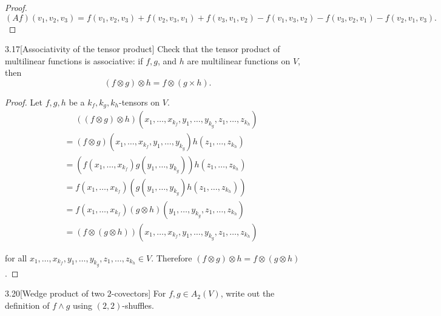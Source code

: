 \begin{proof}
    \( (Af)(v_{1}, v_{2}, v_{3}) = f(v_{1}, v_{2}, v_{3}) + f(v_{2}, v_{3}, v_{1}) + f(v_{3}, v_{1}, v_{2}) - f(v_{1}, v_{3}, v_{2}) - f(v_{3}, v_{2}, v_{1}) - f(v_{2}, v_{1}, v_{3}). \)
\end{proof}

\begin{exercise}{3.17}[Associativity of the tensor product]
    Check that the tensor product of multilinear functions is associative: if \( f, g \), and \( h \) are multilinear functions on \( V \), then
    \[
        (f \otimes g)\otimes h = f\otimes (g\times h).
    \]
\end{exercise}

\begin{proof}
    Let \( f, g, h \) be a \( k_{f}, k_{g}, k_{h} \)-tensors on \( V \).
    \begingroup
    \allowdisplaybreaks%
    \begin{align*}
         & \phantom{=} ((f \otimes g) \otimes h)(x_{1}, \ldots, x_{k_{f}}, y_{1}, \ldots, y_{k_{g}}, z_{1}, \ldots, z_{k_{h}}) \\
         & = (f \otimes g)(x_{1}, \ldots, x_{k_{f}}, y_{1}, \ldots, y_{k_{g}}) h(z_{1}, \ldots, z_{k_{h}})                     \\
         & = (f(x_{1}, \ldots, x_{k_{f}}) g(y_{1}, \ldots, y_{k_{g}}))  h(z_{1}, \ldots, z_{k_{h}})                            \\
         & = f(x_{1}, \ldots, x_{k_{f}}) (g(y_{1}, \ldots, y_{k_{g}}) h(z_{1}, \ldots, z_{k_{h}}))                             \\
         & = f(x_{1}, \ldots, x_{k_{f}}) (g \otimes h)(y_{1}, \ldots, y_{k_{g}}, z_{1}, \ldots, z_{k_{h}})                     \\
         & = (f \otimes (g \otimes h))(x_{1}, \ldots, x_{k_{f}}, y_{1}, \ldots, y_{k_{g}}, z_{1}, \ldots, z_{k_{h}})
    \end{align*}
    \endgroup

    for all \( x_{1}, \ldots, x_{k_{f}}, y_{1}, \ldots, y_{k_{g}}, z_{1}, \ldots, z_{k_{h}} \in V \). Therefore \( (f\otimes g)\otimes h = f\otimes (g\otimes h) \).
\end{proof}

\begin{exercise}{3.20}[Wedge product of two \( 2 \)-covectors]
    For \( f, g \in A_{2}(V) \), write out the definition of \( f \wedge g \) using \( (2, 2) \)-shuffles.
\end{exercise}

